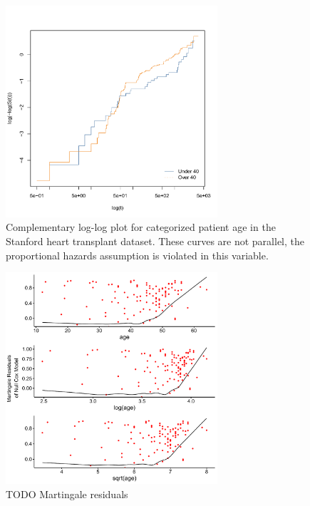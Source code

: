 \begin{figure}[H]
\centering
\includegraphics[width=0.7\textwidth]{figures/survival/stanford_cloglog}
\vspace{0.2cm}
\caption{
Complementary log-log plot for categorized patient age
in the Stanford heart transplant dataset.
These curves are not parallel,
the proportional hazards assumption is violated in this variable.
}
\label{fig:stanford_cloglog}
\end{figure}

\begin{figure}[H]
\centering
\includegraphics[width=0.7\textwidth]{figures/survival/stanford_cox_age_martingale_residuals}
\vspace{0.2cm}
\caption{
TODO Martingale residuals
}
\label{fig:cox:martingale_residuals}
\end{figure}

